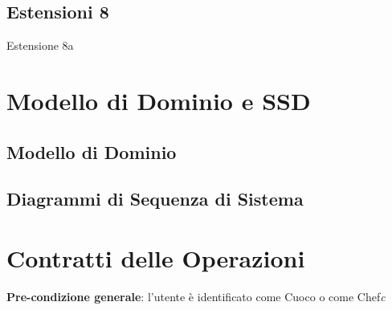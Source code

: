 \documentclass[letterpaper, italian]{report}
\begin{document}
\section*{Estensioni 8}
\begin{table}[H]\centering\caption{Estensione 8a}
\end{table}

\chapter{Modello di Dominio e SSD}
\section{Modello di Dominio}
\section{Diagrammi di Sequenza di Sistema}

\chapter{Contratti delle Operazioni}
\textbf{Pre-condizione generale}{: l'utente è identificato come Cuoco o come Chef}\textit{c}
\end{document}
